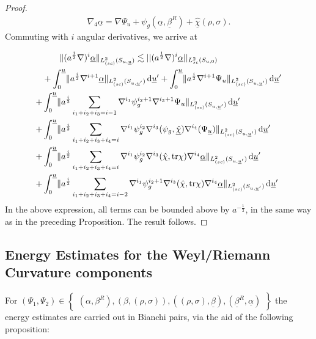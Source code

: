 \documentclass{amsart}
\newcommand{\aln}{(\al \nabla)^i}
\newcommand{\tbeta}{\beta^R}
\newcommand{\tbetabar}{\betabar^R}
\newcommand{\dubarprime}{\hspace{.5mm} \text{d} \ubar^{\prime}}
\newcommand{\intubar}{\int_0^{\ubar}}
\newcommand{\chihat}{\hat{\chi}}
\newcommand{\al}{a^{\frac{1}{2}}}
\newcommand{\chibarhat}{\underline{\hat{\chi}}}
\newcommand{\ubar}{\underline{u}}
\newcommand{\sumif}{\sum_{i_1+i_2+i_3+i_4=i}}
\newcommand{\sumifim}{\sum_{i_1+i_2+i_3+i_4=i-2}}
\newcommand{\nablap}{\nabla^{i_1}\psi_g^{i_2}}
\newcommand{\nablapp}{\nabla^{i_1}\psi_g^{i_2+1}}
\newcommand{\scaletwoSu}[1]{\lVert{#1} \rVert_{L^2_{(sc)}(S_{u,\ubar})}}
\newcommand{\scaletwoSuubarprime}[1]{\lVert{#1} \rVert_{L^2_{(sc)}(S_{u,\ubar^\prime})}}
\newcommand{\alphabar}{\underline{\alpha}}
\newcommand{\betabar}{\underline{\beta}}
\newcommand{\nablat}{\nabla^{i_3}}
\newcommand{\nablaf}{\nabla^{i_4}}
\newcommand{\alphabarF}{\alphabar^F}
\newcommand{\alphaF}{\alpha^F}
\newcommand{\tr}{\mbox{tr}}
\begin{document}
{\begin{proof}
	    
	    \begin{align}
	        \nabla_4\alphabar = \nabla\Psi_u + \psi_g (\alphabar, \tbetabar) +\chibarhat(\rho,\sigma).
	    \end{align}Commuting with $i$ angular derivatives, we arrive at 




\begin{align}
 \nonumber     &\hspace{7mm}\scaletwoSu{\aln \alphabar} \lesssim ||(a^{\frac{1}{2}}\nabla)^{i}\alphabar||_{L^{2}_{sc}(S_{u,0})}\\  \nonumber &+\intubar \scaletwoSuubarprime{a^{\frac{i}{2}} \nabla^{i+1}\alphabar} \dubarprime +\intubar \scaletwoSuubarprime{a^{\frac{i}{2}} \nabla^{i+1}\Psi_u} \dubarprime \\  \nonumber + &\intubar \scaletwoSuubarprime{a^{\frac{i}{2}}\sum_{i_1+i_2+i_3=i-1}\nablapp \nabla^{i_3+1}\Psi_u}\dubarprime \\ \nonumber +&\intubar \scaletwoSuubarprime{a^{\frac{i}{2}}\sumif\nablap \nablat(\psi_g, \chibarhat)\nablaf(\Psi_{\ubar})} \dubarprime \\ \nonumber +& \intubar \scaletwoSuubarprime{a^{\frac{i}{2}}\sumif \nablap \nablat(\chihat,\tr\chi)\nablaf\alphabar }\dubarprime \\ \nonumber +& \intubar \scaletwoSuubarprime{a^{\frac{i}{2}}\sumifim \nablapp \nablat(\chihat,\tr\chi)\nablaf \alphabar}\dubarprime 
\end{align}In the above expression, all terms can be bounded above by $a^{-\frac{1}{2}}$, in the same way as in the preceding Proposition. The result follows. 

\end{proof}



\subsection{Energy Estimates for the Weyl/Riemann Curvature components}


\par \noindent For $(\Psi_1, \Psi_2) \in \begin{Bmatrix} (\alpha, \tbeta) , (\beta, (\rho,\sigma)), ((\rho,\sigma),\betabar), (\tbetabar, \alphabar) \end{Bmatrix}$ the energy estimates are carried out in Bianchi pairs, via the aid of the following proposition:

}
\end{document}
